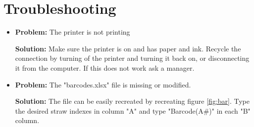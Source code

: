 \documentclass[letterpaper,12pt]{article}
\begin{document}
\section{Troubleshooting}

\begin{itemize}
	\item {\bf Problem:} The printer is not printing
		\begin{adjustwidth}{1cm}{}
		{\bf Solution:} Make sure the printer is on and has paper and ink. Recycle the connection by turning of the printer and turning it back on, or disconnecting it from the computer.  If this does not work ask a manager. 
		\end{adjustwidth}
	\item {\bf Problem:} The "barcodes.xlsx" file is missing or modified.
		\begin{adjustwidth}{1cm}{}
		{\bf Solution:} The file can be easily recreated by recreating figure \ref{fig:bar}.  Type the desired straw indexes in column "A" and type "Barcode(A\#)" in each "B" column. 
		\end{adjustwidth}
	






\end{itemize}
\end{document}
